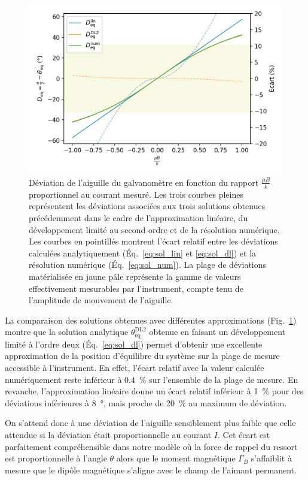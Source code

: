 \documentclass[12pt,a4paper,fleqn]{article}
\begin{document}
\begin{figure}[htbp]
    \center
    \includegraphics[scale=1]{deviation.png}
    \caption{Déviation de l'aiguille du galvanomètre en fonction du rapport $\tfrac{\mu B}{k}$ proportionnel au courant mesuré.
Les trois courbes pleines représentent les déviations associées aux trois solutions obtenues précédemment dans le cadre de l'approximation linéaire, du développement limité au second ordre et de la résolution numérique.
Les courbes en pointillés montrent l'écart relatif entre les déviations calculées analytiquement (Éq.~\ref{eq:sol_lin} et \ref{eq:sol_dl}) et la résolution numérique (Éq.~\ref{eq:sol_num}).
La plage de déviations matérialisée en jaune pâle représente la gamme de valeurs effectivement mesurables par l'instrument, compte tenu de l'amplitude de mouvement de l'aiguille.}
    \label{fig:deviation}
\end{figure}

La comparaison des solutions obtenues avec différentes approximations (Fig.~\ref{fig:deviation}) montre que la solution analytique $\theta_\mathrm{eq}^\mathrm{DL2}$ obtenue en faisant un développement limité à l'ordre deux (Éq.~\ref{eq:sol_dl}) permet d'obtenir une excellente approximation de la position d'équilibre du système sur la plage de mesure accessible à l'instrument.
En effet, l'écart relatif avec la valeur calculée numériquement reste inférieur à \SI{0.4}{\percent} sur l'ensemble de la plage de mesure.
En revanche, l'approximation linéaire donne un écart relatif inférieur à \SI{1}{\%} pour des déviations inférieures à \SI{8}{\degree}, mais proche de \SI{20}{\%} au maximum de déviation.

On s'attend donc à une déviation de l'aiguille sensiblement plus faible que celle attendue si la déviation était proportionnelle au courant $I$.
Cet écart est parfaitement compréhensible dans notre modèle où la force de rappel du ressort est proportionnelle à l'angle $\theta$ alors que le moment magnétique $\Gamma_B$ s'affaiblit à mesure que le dipôle magnétique s'aligne avec le champ de l'aimant permanent.
\end{document}
